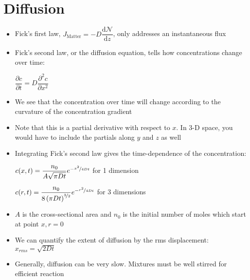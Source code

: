\documentclass[12pt, openany, letterpaper]{memoir}
\begin{document}
\section{Diffusion}
\begin{itemize}
	\item Fick's first law, $J_{\mathrm{Matter}}=-D\dfrac{\mathrm{d}\mathcal{N}}{\mathrm{d}z}$, only addresses an instantaneous flux
	\item Fick's second law, or the diffusion equation, tells how concentrations change over time:

	      $\dfrac{\partial c}{\partial t} = D\dfrac{\partial^2 c}{\partial x^2}$
	\item We see that the concentration over time will change according to the curvature of the concentration gradient
	\item Note that this is a partial derivative with respect to $x$. In 3-D space, you would have to include the partials along $y$ and $z$ as well
	\item Integrating Fick's second law gives the time-dependence of the concentration:

	      $c(x,t)=\dfrac{n_0}{A\sqrt{\pi Dt}}e^{-\nicefrac{x^2}{4Dt}}$ \hspace{2em} for 1 dimension

	      $c(r,t)=\dfrac{n_0}{8\left(\pi Dt\right)^{\nicefrac{3}{2}}}e^{-\nicefrac{r^2}{4Dt}}$ \hspace{2em} for 3 dimensions
	\item $A$ is the cross-sectional area and $n_0$ is the initial number of moles which start at point $x,r=0$
	\item We can quantify the extent of diffusion by the rms displacement: $x_{rms} = \sqrt{2Dt}$
	\item Generally, diffusion can be very slow. Mixtures must be well stirred for efficient reaction
\end{itemize}
\end{document}
